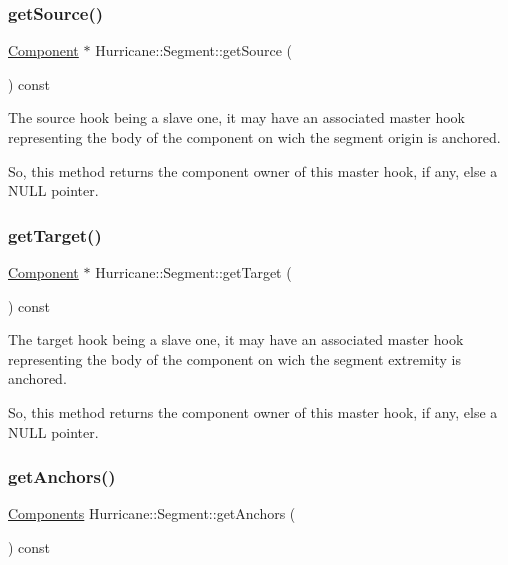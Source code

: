 \subsubsection{\texorpdfstring{get\+Source()}{getSource()}}
{\footnotesize\ttfamily \mbox{\hyperlink{classHurricane_1_1Component}{Component}} $\ast$ Hurricane\+::\+Segment\+::get\+Source (\begin{DoxyParamCaption}{ }\end{DoxyParamCaption}) const}

The source hook being a slave one, it may have an associated master hook representing the body of the component on wich the segment origin is anchored.

So, this method returns the component owner of this master hook, if any, else a N\+U\+LL pointer. \mbox{\label{classHurricane_1_1Segment_a1f7f13b33be3b1a20ea23b3f501296e9}} 
\subsubsection{\texorpdfstring{get\+Target()}{getTarget()}}
{\footnotesize\ttfamily \mbox{\hyperlink{classHurricane_1_1Component}{Component}} $\ast$ Hurricane\+::\+Segment\+::get\+Target (\begin{DoxyParamCaption}{ }\end{DoxyParamCaption}) const}

The target hook being a slave one, it may have an associated master hook representing the body of the component on wich the segment extremity is anchored.

So, this method returns the component owner of this master hook, if any, else a N\+U\+LL pointer. \mbox{\label{classHurricane_1_1Segment_ac179f0263fee7fc71e03c9cf8c2d4e45}} 
\subsubsection{\texorpdfstring{get\+Anchors()}{getAnchors()}}
{\footnotesize\ttfamily \mbox{\hyperlink{namespaceHurricane_a7d26d99aeb5dd6d70d51bd35d2473e72}{Components}} Hurricane\+::\+Segment\+::get\+Anchors (\begin{DoxyParamCaption}{ }\end{DoxyParamCaption}) const}

